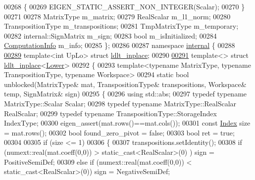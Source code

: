\begin{DoxyCode}
00268     \{
00269       EIGEN\_STATIC\_ASSERT\_NON\_INTEGER(Scalar);
00270     \}
00271 
00278     MatrixType m\_matrix;
00279     RealScalar m\_l1\_norm;
00280     TranspositionType m\_transpositions;
00281     TmpMatrixType m\_temporary;
00282     internal::SignMatrix m\_sign;
00283     \textcolor{keywordtype}{bool} m\_isInitialized;
00284     \hyperlink{group__enums_ga85fad7b87587764e5cf6b513a9e0ee5e}{ComputationInfo} m\_info;
00285 \};
00286 
00287 \textcolor{keyword}{namespace }\hyperlink{namespaceinternal}{internal} \{
00288 
\hyperlink{struct_eigen_1_1internal_1_1ldlt__inplace}{00289} \textcolor{keyword}{template}<\textcolor{keywordtype}{int} UpLo> \textcolor{keyword}{struct }\hyperlink{struct_eigen_1_1internal_1_1ldlt__inplace}{ldlt\_inplace};
00290 
\hyperlink{struct_eigen_1_1internal_1_1ldlt__inplace_3_01_lower_01_4}{00291} \textcolor{keyword}{template}<> \textcolor{keyword}{struct }\hyperlink{struct_eigen_1_1internal_1_1ldlt__inplace}{ldlt\_inplace}<\hyperlink{group__enums_gga39e3366ff5554d731e7dc8bb642f83cda891792b8ed394f7607ab16dd716f60e6}{Lower}>
00292 \{
00293   \textcolor{keyword}{template}<\textcolor{keyword}{typename} MatrixType, \textcolor{keyword}{typename} TranspositionType, \textcolor{keyword}{typename} Workspace>
00294   \textcolor{keyword}{static} \textcolor{keywordtype}{bool} unblocked(MatrixType& mat, TranspositionType& transpositions, Workspace& temp, SignMatrix& 
      sign)
00295   \{
00296     \textcolor{keyword}{using} std::abs;
00297     \textcolor{keyword}{typedef} \textcolor{keyword}{typename} MatrixType::Scalar Scalar;
00298     \textcolor{keyword}{typedef} \textcolor{keyword}{typename} MatrixType::RealScalar RealScalar;
00299     \textcolor{keyword}{typedef} \textcolor{keyword}{typename} TranspositionType::StorageIndex IndexType;
00300     eigen\_assert(mat.rows()==mat.cols());
00301     \textcolor{keyword}{const} \hyperlink{namespace_eigen_a62e77e0933482dafde8fe197d9a2cfde}{Index} size = mat.rows();
00302     \textcolor{keywordtype}{bool} found\_zero\_pivot = \textcolor{keyword}{false};
00303     \textcolor{keywordtype}{bool} ret = \textcolor{keyword}{true};
00304 
00305     \textcolor{keywordflow}{if} (size <= 1)
00306     \{
00307       transpositions.setIdentity();
00308       \textcolor{keywordflow}{if} (numext::real(mat.coeff(0,0)) > static\_cast<RealScalar>(0) ) sign = PositiveSemiDef;
00309       \textcolor{keywordflow}{else} \textcolor{keywordflow}{if} (numext::real(mat.coeff(0,0)) < static\_cast<RealScalar>(0)) sign = NegativeSemiDef;

\end{DoxyCode}
